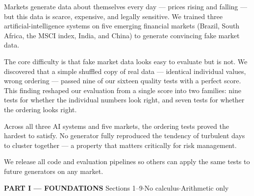 \documentclass[10pt]{article}
\begin{document}
\begin{tcolorbox}[enhanced,arc=4pt,boxrule=1pt,colframe=Teal,colback=TealBg,
  top=6pt,bottom=6pt,left=8pt,right=8pt,before skip=4pt,after skip=8pt]
\small
Markets generate data about themselves every day --- prices rising and falling --- but this data is scarce, expensive, and legally sensitive.
We trained three artificial-intelligence systems on five emerging financial markets (Brazil, South Africa, the MSCI index, India, and China) to generate convincing fake market data.

The core difficulty is that fake market data looks easy to evaluate but is not.
We discovered that a simple shuffled copy of real data --- identical individual values, wrong ordering --- passed nine of our sixteen quality tests with a perfect score.
This finding reshaped our evaluation from a single score into two families: nine tests for whether the individual numbers look right, and seven tests for whether the ordering looks right.

Across all three AI systems and five markets, the ordering tests proved the hardest to satisfy.
No generator fully reproduced the tendency of turbulent days to cluster together --- a property that matters critically for risk management.

We release all code and evaluation pipelines so others can apply the same tests to future generators on any market.
\end{tcolorbox}

\vspace{4pt}
\begin{tcolorbox}[enhanced,arc=0pt,outer arc=0pt,boxrule=0pt,
  colback=Navy!10,colframe=Navy!10,top=3pt,bottom=3pt,left=8pt,right=8pt]
{\large\bfseries\color{Navy} PART I --- FOUNDATIONS}
\hfill{\small\color{Navy!70} Sections 1--9\quad$\cdot$\quad No calculus\quad$\cdot$\quad Arithmetic only}
\end{tcolorbox}
\end{document}
